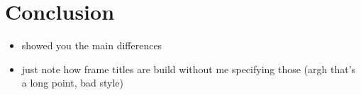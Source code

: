 \section{Conclusion}
\begin{frame}{}{}%
  \begin{itemize}
    \item showed you the main differences
    \item just note how frame titles are build without me specifying those (argh
      that's a long point, bad style)
  \end{itemize}
\end{frame}%

